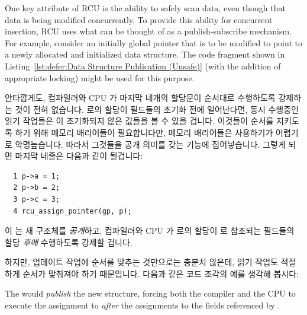 One key attribute of RCU is the ability to safely scan data, even
though that data is being modified concurrently.
To provide this ability for concurrent insertion,
RCU uses what can be thought of as a publish-subscribe mechanism.
For example, consider an initially  global pointer
 that is to be modified to point to a newly allocated
and initialized data structure.
The code fragment shown in
Listing~\ref{lst:defer:Data Structure Publication (Unsafe)}
(with the addition of appropriate locking)
might be used for this purpose.
\fi

안타깝게도, 컴파일러와 CPU 가 마지막 네개의 할당문이 순서대로 수행하도록
강제하는 것이 전혀 없습니다.
 로의 할당이  필드들의 초기화 전에 일어난다면, 동시 수행중인 읽기
작업들은 이 초기화되지 않은 값들을 볼 수 있을 겁니다.
이것들이 순서를 지키도록 하기 위해 메모리 배리어들이 필요합니다만, 메모리
배리어들은 사용하기가 어렵기로 악명높습니다.
따라서 그것들을 공개 의미를 갖는  기능에 집어넣습니다.
그렇게 되면 마지막 네줄은 다음과 같이 될겁니다:

\vspace{5pt}
\begin{minipage}[t]{\columnwidth}
\scriptsize
\begin{verbatim}
  1 p->a = 1;
  2 p->b = 2;
  3 p->c = 3;
  4 rcu_assign_pointer(gp, p);
\end{verbatim}
\end{minipage}
\vspace{5pt}

이  는 새 구조체를 \emph{공개}하고, 컴파일러와 CPU 가
 로의 할당이  로 참조되는 필드들의 할당 \emph{후에} 수행하도록
강제할 겁니다.

하지만, 업데이트 작업에 순서를 맞추는 것만으로는 충분치 않은데, 읽기 작업도
적절하게 순서가 맞춰져야 하기 때문입니다.
다음과 같은 코드 조각의 예를 생각해 봅시다:
\iffalse

The 
would \emph{publish} the new structure, forcing both the compiler
and the CPU to execute the assignment to  \emph{after}
the assignments to the fields referenced by .

